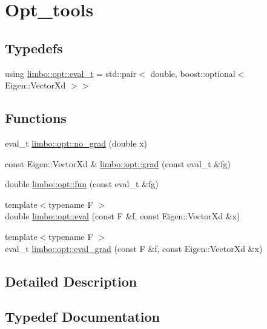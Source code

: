 \hypertarget{group__opt__tools}{}\section{Opt\+\_\+tools}
\label{group__opt__tools}
\subsection*{Typedefs}
\begin{DoxyCompactItemize}
\item 
using \hyperlink{group__opt__tools_ga362b55973a38ac71f27a06f9d9c14f24}{limbo\+::opt\+::eval\+\_\+t} = std\+::pair$<$ double, boost\+::optional$<$ Eigen\+::\+Vector\+Xd $>$$>$
\end{DoxyCompactItemize}
\subsection*{Functions}
\begin{DoxyCompactItemize}
\item 
eval\+\_\+t \hyperlink{group__opt__tools_ga38e53ccac21f452bd31e9b239985d456}{limbo\+::opt\+::no\+\_\+grad} (double x)
\item 
const Eigen\+::\+Vector\+Xd \& \hyperlink{group__opt__tools_gaf28d9af930b2993024ab497b285e0521}{limbo\+::opt\+::grad} (const eval\+\_\+t \&fg)
\item 
double \hyperlink{group__opt__tools_ga68ad00d7501bc26a2a0990bac762393e}{limbo\+::opt\+::fun} (const eval\+\_\+t \&fg)
\item 
{\footnotesize template$<$typename F $>$ }\\double \hyperlink{group__opt__tools_ga698d932ac52cab812742b1300f875372}{limbo\+::opt\+::eval} (const F \&f, const Eigen\+::\+Vector\+Xd \&x)
\item 
{\footnotesize template$<$typename F $>$ }\\eval\+\_\+t \hyperlink{group__opt__tools_ga6abbcdf8d83abca89802881d883fb9e3}{limbo\+::opt\+::eval\+\_\+grad} (const F \&f, const Eigen\+::\+Vector\+Xd \&x)
\end{DoxyCompactItemize}


\subsection{Detailed Description}


\subsection{Typedef Documentation}
\hypertarget{group__opt__tools_ga362b55973a38ac71f27a06f9d9c14f24}{}
